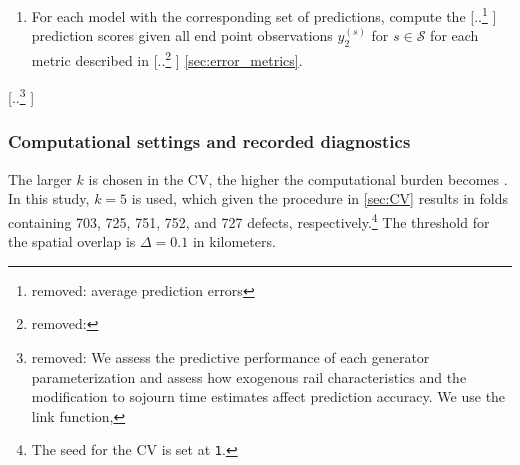\documentclass{article}
\providecommand{\DIFadd}[1]{{\protect\color{blue} \sf #1}} %
\providecommand{\DIFdel}[1]{{\protect\color{red} [..\footnote{removed: #1} ]}} %
\providecommand{\DIFaddbegin}{} %
\providecommand{\DIFaddend}{} %
\providecommand{\DIFdelbegin}{} %
\providecommand{\DIFdelend}{} %
\begin{document}
\begin{enumerate}
\begin{enumerate}
        \item The models are used to produce predictions of the distributions of \DIFdelbegin \DIFdel{$\bm{\pi}^{(s)}\left( t_2^{(s)}\right)$ }\DIFdelend \DIFaddbegin \DIFadd{$\widehat{\bm{\pi}}^{(s)}\left( t_2^{(s)}\right)$ }\DIFaddend for the defects $s \in \mathcal{S}_i$ provided their corresponding initial state $y_1^{(s)}$, their initial time stamp $t_1^{(s)}$, and the covariates $\bm{z}^{(s)}$ (for the Markov jump process) or $\bm{z}'^{(s)}$ (for the cumulative link model).
        \item If $i < k$, then increase $i = i + 1$ and GOTO (a); else GOTO \DIFdelbegin \DIFdel{4.
    }\DIFdelend \DIFaddbegin \DIFadd{3.
    }\DIFaddend \end{enumerate}
    \item For each model with the corresponding set of predictions, compute the \DIFdelbegin \DIFdel{average prediction errors }\DIFdelend \DIFaddbegin \DIFadd{prediction scores }\DIFaddend given all end point observations $y_2^{(s)}$ for $s \in \mathcal{S}$ for each metric described in \DIFdelbegin \DIFdel{}\DIFdelend \DIFaddbegin \DIFadd{\cref{sec:error_metrics}}\DIFaddend .
\end{enumerate}

\DIFdelbegin \DIFdel{We assess the predictive performance of each generator parameterization and assess how exogenous rail characteristics and the modification to sojourn time estimates affect prediction accuracy.
We use the link function, }\DIFdelend \DIFaddbegin \subsubsection{\DIFadd{Computational settings and recorded diagnostics}} \label{sec:CV_details}
\DIFadd{The larger $k$ is chosen in the CV, the higher the computational burden becomes \citep{fushiki2011a}. In this study, $k=5$ is used, which given the procedure in \cref{sec:CV} results in folds containing \num{703}, \num{725}, \num{751}, \num{752}, and \num{727} defects, respectively.}\footnote{\DIFadd{The seed for the CV is set at \texttt{1}.}} \DIFadd{The threshold for the spatial overlap is $\Delta = 0.1$ in kilometers.
}
\end{document}
